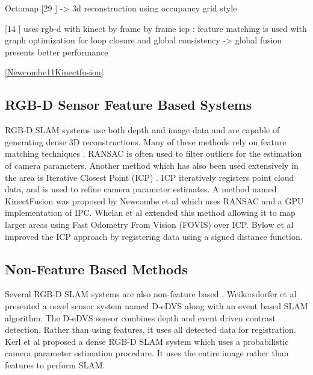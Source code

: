 Octomap [29 \cite{Wurm10Octomap}] -> 3d reconstruction using occupancy grid style 

[14 \cite{Henry10Rgb}] uses rgb-d with kinect by frame by frame icp : feature matching is used with graph optimization for loop closure and global consistency -> global fusion presents better performance








































\ref{Newcombe11Kinectfusion}

\subsection{RGB-D Sensor Feature Based Systems}
RGB-D SLAM systems use both depth and image data and are capable of generating dense 3D reconstructions. Many of these methods rely on feature matching techniques \cite{Engelhard11Real,Henry10Rgb,Endres12Evaluation}. RANSAC is often used to filter outliers for the estimation of camera parameters\cite{Engelhard11Real,Henry10Rgb,Endres12Evaluation}. Another method which has also been used extensively in the area is Iterative Closest Point (ICP) \cite{Engelhard11Real,Henry10Rgb,Bylow13Real,Newcombe11Kinectfusion,Stuckler12Robust,Izadi11Kinectfusion}. ICP iteratively registers point cloud data, and is used to refine camera parameter estimates. A method named KinectFusion was proposed by Newcombe et al \cite{Newcombe11Kinectfusion} which uses RANSAC and a GPU implementation of IPC. Whelan et al \cite{Whelan12Kintinuous} extended this method allowing it to map larger areas using Fast Odometry From Vision (FOVIS) over ICP. Bylow et al \cite{Bylow13Real} improved the ICP approach by registering data using a signed distance function.
\subsection{Non-Feature Based Methods}
Several RGB-D SLAM systems are also non-feature based \cite{Weikersdorfer14Event,Izadi11Kinectfusion,Kerl13Dense}. Weikersdorfer et al \cite{Weikersdorfer14Event} presented a novel sensor system named D-eDVS along with an event based SLAM algorithm. The D-eDVS sensor combines depth and event driven contrast detection. Rather than using features, it uses all detected data for registration. Kerl et al \cite{Kerl13Dense} proposed a dense RGB-D SLAM system which uses a probabilistic camera parameter estimation procedure. It uses the entire image rather than features to perform SLAM.
